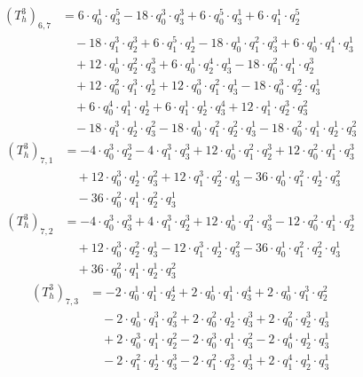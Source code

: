 \begin{align*}(T_{h}^3)_{6,7}&=6\cdot q_0^{1}\cdot q_3^{5}-18\cdot q_0^{3}\cdot q_3^{3}+6\cdot q_0^{5}\cdot q_3^{1}+6\cdot q_1^{1}\cdot q_2^{5}\\
&\quad -18\cdot q_1^{3}\cdot q_2^{3}+6\cdot q_1^{5}\cdot q_2^{1}-18\cdot q_0^{1}\cdot q_1^{2}\cdot q_3^{3}+6\cdot q_0^{1}\cdot q_1^{4}\cdot q_3^{1}\\
&\quad +12\cdot q_0^{1}\cdot q_2^{2}\cdot q_3^{3}+6\cdot q_0^{1}\cdot q_2^{4}\cdot q_3^{1}-18\cdot q_0^{2}\cdot q_1^{1}\cdot q_2^{3}\\
&\quad +12\cdot q_0^{2}\cdot q_1^{3}\cdot q_2^{1}+12\cdot q_0^{3}\cdot q_1^{2}\cdot q_3^{1}-18\cdot q_0^{3}\cdot q_2^{2}\cdot q_3^{1}\\
&\quad +6\cdot q_0^{4}\cdot q_1^{1}\cdot q_2^{1}+6\cdot q_1^{1}\cdot q_2^{1}\cdot q_3^{4}+12\cdot q_1^{1}\cdot q_2^{3}\cdot q_3^{2}\\
&\quad -18\cdot q_1^{3}\cdot q_2^{1}\cdot q_3^{2}-18\cdot q_0^{1}\cdot q_1^{2}\cdot q_2^{2}\cdot q_3^{1}-18\cdot q_0^{2}\cdot q_1^{1}\cdot q_2^{1}\cdot q_3^{2}\end{align*}
\begin{align*}(T_{h}^3)_{7,1}&=-4\cdot q_0^{3}\cdot q_2^{3}-4\cdot q_1^{3}\cdot q_3^{3}+12\cdot q_0^{1}\cdot q_1^{2}\cdot q_2^{3}+12\cdot q_0^{2}\cdot q_1^{1}\cdot q_3^{3}\\
&\quad +12\cdot q_0^{3}\cdot q_2^{1}\cdot q_3^{2}+12\cdot q_1^{3}\cdot q_2^{2}\cdot q_3^{1}-36\cdot q_0^{1}\cdot q_1^{2}\cdot q_2^{1}\cdot q_3^{2}\\
&\quad -36\cdot q_0^{2}\cdot q_1^{1}\cdot q_2^{2}\cdot q_3^{1}\end{align*}
\begin{align*}(T_{h}^3)_{7,2}&=-4\cdot q_0^{3}\cdot q_3^{3}+4\cdot q_1^{3}\cdot q_2^{3}+12\cdot q_0^{1}\cdot q_1^{2}\cdot q_3^{3}-12\cdot q_0^{2}\cdot q_1^{1}\cdot q_2^{3}\\
&\quad +12\cdot q_0^{3}\cdot q_2^{2}\cdot q_3^{1}-12\cdot q_1^{3}\cdot q_2^{1}\cdot q_3^{2}-36\cdot q_0^{1}\cdot q_1^{2}\cdot q_2^{2}\cdot q_3^{1}\\
&\quad +36\cdot q_0^{2}\cdot q_1^{1}\cdot q_2^{1}\cdot q_3^{2}\end{align*}
\begin{align*}(T_{h}^3)_{7,3}&=-2\cdot q_0^{1}\cdot q_1^{1}\cdot q_2^{4}+2\cdot q_0^{1}\cdot q_1^{1}\cdot q_3^{4}+2\cdot q_0^{1}\cdot q_1^{3}\cdot q_2^{2}\\
&\quad -2\cdot q_0^{1}\cdot q_1^{3}\cdot q_3^{2}+2\cdot q_0^{2}\cdot q_2^{1}\cdot q_3^{3}+2\cdot q_0^{2}\cdot q_2^{3}\cdot q_3^{1}\\
&\quad +2\cdot q_0^{3}\cdot q_1^{1}\cdot q_2^{2}-2\cdot q_0^{3}\cdot q_1^{1}\cdot q_3^{2}-2\cdot q_0^{4}\cdot q_2^{1}\cdot q_3^{1}\\
&\quad -2\cdot q_1^{2}\cdot q_2^{1}\cdot q_3^{3}-2\cdot q_1^{2}\cdot q_2^{3}\cdot q_3^{1}+2\cdot q_1^{4}\cdot q_2^{1}\cdot q_3^{1}\end{align*}
